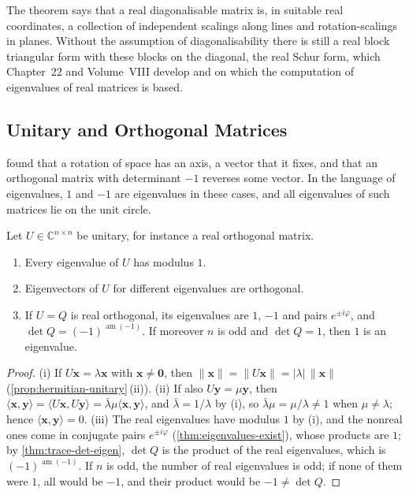 The theorem says that a real diagonalisable matrix is, in suitable real coordinates, a collection of independent scalings along lines and rotation-scalings in planes. Without the assumption of diagonalisability there is still a real block triangular form with these blocks on the diagonal, the real Schur form, which Chapter~22 and Volume~VIII develop and on which the computation of eigenvalues of real matrices is based.

\subsection{Unitary and Orthogonal Matrices}

 found that a rotation of space has an axis, a vector that it fixes, and that an orthogonal matrix with determinant $-1$ reverses some vector. In the language of eigenvalues, $1$ and $-1$ are eigenvalues in these cases, and all eigenvalues of such matrices lie on the unit circle.

\begin{proposition}
\label{prop:unitary-eigen}
Let $U\in\mathbb C^{n\times n}$ be unitary, for instance a real orthogonal matrix.
\begin{enumerate}
\item Every eigenvalue of $U$ has modulus $1$.
\item Eigenvectors of $U$ for different eigenvalues are orthogonal.
\item If $U=Q$ is real orthogonal, its eigenvalues are $1$, $-1$ and pairs $e^{\pm i\varphi}$, and $\det Q=(-1)^{\operatorname{am}(-1)}$. If moreover $n$ is odd and $\det Q=1$, then $1$ is an eigenvalue.
\end{enumerate}
\end{proposition}

\begin{proof}
(i) If $U\mathbf x=\lambda\mathbf x$ with $\mathbf x\ne\mathbf 0$, then $\|\mathbf x\|=\|U\mathbf x\|=|\lambda|\,\|\mathbf x\|$ (\cref{prop:hermitian-unitary}\,(ii)). (ii) If also $U\mathbf y=\mu\mathbf y$, then $\langle\mathbf x,\mathbf y\rangle=\langle U\mathbf x,U\mathbf y\rangle=\bar\lambda\mu\langle\mathbf x,\mathbf y\rangle$, and $\bar\lambda=1/\lambda$ by (i), so $\bar\lambda\mu=\mu/\lambda\ne1$ when $\mu\ne\lambda$; hence $\langle\mathbf x,\mathbf y\rangle=0$. (iii) The real eigenvalues have modulus $1$ by (i), and the nonreal ones come in conjugate pairs $e^{\pm i\varphi}$ (\cref{thm:eigenvalues-exist}), whose products are $1$; by \cref{thm:trace-det-eigen}, $\det Q$ is the product of the real eigenvalues, which is $(-1)^{\operatorname{am}(-1)}$. If $n$ is odd, the number of real eigenvalues is odd; if none of them were $1$, all would be $-1$, and their product would be $-1\ne\det Q$.
\end{proof}

